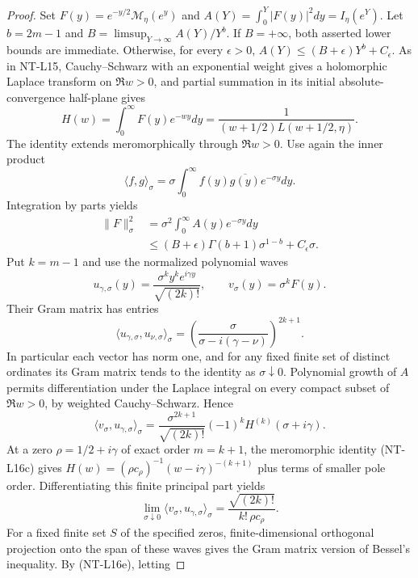 \documentclass[11pt,a4paper]{article}
\begin{document}
\begin{proof}
Set $F(y)=e^{-y/2}\mathcal M_\eta(e^y)$ and
$A(Y)=\int_0^Y|F(y)|^2dy=I_\eta(e^Y)$.
Let $b=2m-1$ and
$B=\limsup_{Y\to\infty}A(Y)/Y^b$.
If $B=+\infty$, both asserted lower bounds are immediate.
Otherwise, for every $\epsilon>0$,
$A(Y)\le(B+\epsilon)Y^b+C_\epsilon$.
As in NT-L15, Cauchy--Schwarz with an exponential weight gives a
holomorphic Laplace transform on $\Re w>0$, and partial summation
in its initial absolute-convergence half-plane gives
\[
 H(w)=\int_0^\infty F(y)e^{-wy}dy
      =\frac1{(w+1/2)L(w+1/2,\eta)}.
                                                        \tag{NT-L16c}
\]
The identity extends meromorphically through $\Re w>0$.
Use again the inner product
\[
 \langle f,g\rangle_\sigma=\sigma\int_0^\infty
       f(y)\overline{g(y)}e^{-\sigma y}dy.
\]
Integration by parts yields
\[
 \begin{split}
 \|F\|_\sigma^2
 &=\sigma^2\int_0^\infty A(y)e^{-\sigma y}dy\\
 &\le (B+\epsilon)\Gamma(b+1)\sigma^{1-b}
                               +C_\epsilon\sigma.
 \end{split}                                           \tag{NT-L16d}
\]
Put $k=m-1$ and use the normalized polynomial waves
\[
 u_{\gamma,\sigma}(y)=
       \frac{\sigma^k y^k e^{i\gamma y}}{\sqrt{(2k)!}},
 \qquad v_\sigma(y)=\sigma^k F(y).
\]
Their Gram matrix has entries
\[
 \langle u_{\gamma,\sigma},u_{\nu,\sigma}\rangle_\sigma
       =\left(\frac{\sigma}{\sigma-i(\gamma-\nu)}\right)^{2k+1}.
                                                        \tag{NT-L16e}
\]
In particular each vector has norm one, and for any fixed finite set
of distinct ordinates its Gram matrix tends to the identity as
$\sigma\downarrow0$. Polynomial growth of $A$ permits differentiation
under the Laplace integral on every compact subset of $\Re w>0$,
by weighted Cauchy--Schwarz. Hence
\[
 \langle v_\sigma,u_{\gamma,\sigma}\rangle_\sigma
 =\frac{\sigma^{2k+1}}{\sqrt{(2k)!}}
                 (-1)^k H^{(k)}(\sigma+i\gamma).
\]
At a zero $\rho=1/2+i\gamma$ of exact order $m=k+1$,
the meromorphic identity (NT-L16c) gives
$H(w)=(\rho c_\rho)^{-1}(w-i\gamma)^{-(k+1)}$
plus terms of smaller pole order. Differentiating this finite
principal part yields
\[
 \lim_{\sigma\downarrow0}
 \langle v_\sigma,u_{\gamma,\sigma}\rangle_\sigma
       =\frac{\sqrt{(2k)!}}{k!\,\rho c_\rho}.           \tag{NT-L16f}
\]
For a fixed finite set $S$ of the specified zeros, finite-dimensional
orthogonal projection onto the span of these waves gives the Gram
matrix version of Bessel's inequality. By (NT-L16e), letting

\end{proof}
\end{document}
